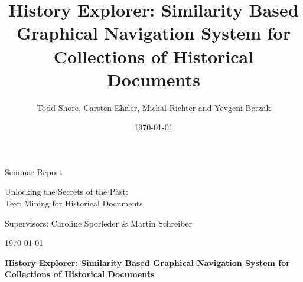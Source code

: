 \documentclass[paper=a4,draft=false]{scrartcl}
\title{History Explorer: Similarity Based Graphical Navigation System for Collections of Historical Documents}
\author{Todd Shore, Carsten Ehrler, Michal Richter and Yevgeni Berzak}
\date{\today}
\begin{document}
\ifpdf
{}
\else
{}
\fi


\begin{titlepage}
\begin{center}
  \vspace{.8in}
  \begin{large}
    Seminar Report\\
  \end{large}
  \vspace{.1in}
  \begin{Large}
    Unlocking the Secrets of the Past:\\
    Text Mining for Historical Documents\\
  \end{Large}
  \vspace{.1in}
  \begin{large}
    Supervisors: Caroline Sporleder \& Martin Schreiber\\
  \end{large}

  \vspace{1.2in}

  \today
  \begin{LARGE}
    \textbf{History Explorer: Similarity Based Graphical Navigation System for Collections of Historical Documents}
  \end{LARGE}

  \vspace{2.5in}

  \end{center}


\end{titlepage}
\end{document}
